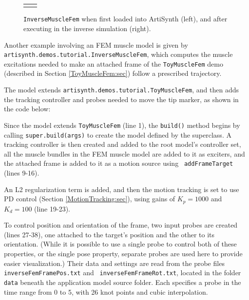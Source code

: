 \begin{figure}[ht]
\begin{center}
\begin{tabular}{cc}
   \fi
\end{tabular}
\end{center}
\caption{{\tt InverseMuscleFem} when first loaded into ArtiSynth (left),
and after executing in the inverse simulation (right).}
\label{InverseMuscleFem:fig}
\end{figure}

Another example involving an FEM muscle model is given by {\tt
artisynth.demos.tutorial.InverseMuscleFem}, which computes the muscle
excitations needed to make an attached frame of the {\tt ToyMuscleFem} demo
(described in Section \ref{ToyMuscleFem:sec}) follow a prescribed trajectory.

The model extends {\tt artisynth.demos.tutorial.ToyMuscleFem}, and then adds
the tracking controller and probes needed to move the tip marker, as shown in
the code below:
%
\lstset{numbers=left}
\iflatexml

\else

\fi
\lstset{numbers=none}
%

Since the model extends {\tt ToyMuscleFem} (line 1), the {\tt build()} method
begins by calling {\tt super.build(args)} to create the model defined by the
superclass. A tracking controller is then created and added to the root model's
controller set, all the muscle bundles in the FEM muscle model are added to it
as exciters, and the attached frame is added to it as a motion source using {\tt
addFrameTarget} (lines 9-16).

An L2 regularization term is added, and then the motion tracking is set to use
PD control (Section \ref{MotionTracking:sec}), using gains of $K_p =
1000$ and $K_d = 100$ (line 19-23).

To control position and orientation of the frame, two input probes are created
(lines 27-38), one attached to the target's {\sf position} and the other to its
{\sf orientation}.  (While it is possible to use a single probe to control both
of these properties, or the single {\sf pose} property, separate probes are
used here to provide easier visualization.) Their data and settings are read
from the probe files {\tt inverseFemFramePos.txt} and {\tt
inverseFemFrameRot.txt}, located in the folder {\tt data} beneath the
application model source folder. Each specifies a probe in the time range from
0 to 5, with 26 knot points and cubic interpolation.

